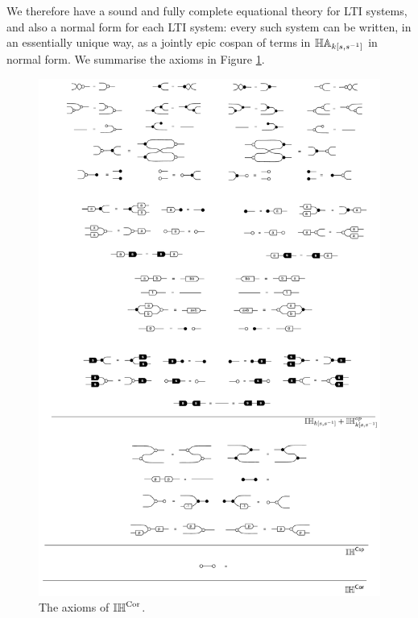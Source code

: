 %

We therefore have a sound and fully complete equational theory for LTI systems,
and also a normal form for each LTI system: every such system can be written, in
an essentially unique way, as a jointly epic cospan of terms in $\mathbb{HA}_{k[s,s^{-1}]}$ in
normal form. We summarise the axioms in Figure \ref{fig.ihcoraxioms}.

\begin{figure} 
  \includegraphics[width=.9\textwidth]{pics/ihcor.pdf}
  \caption{The axioms of $\mathbb{IH}^{\mathrm{Cor}}$.}\label{fig.ihcoraxioms}
\end{figure}

